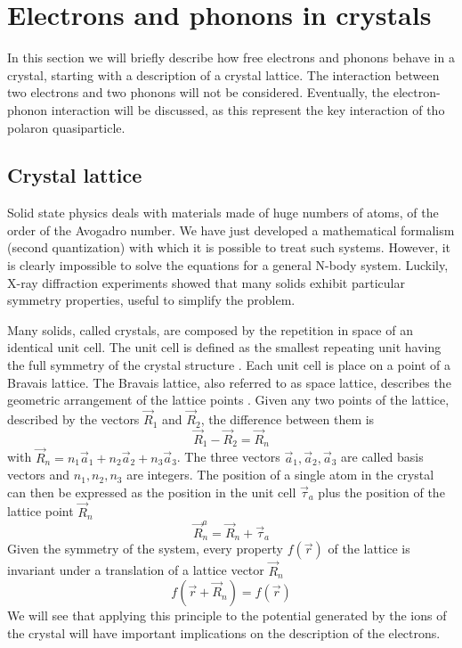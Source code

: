 \section{Electrons and phonons in crystals} \label{sec:electrons_phonons}
In this section we will briefly describe how free electrons and phonons behave in a crystal, starting with a description of a crystal lattice. The interaction between two electrons and two phonons will not be considered. Eventually, the electron-phonon interaction will be discussed, as this represent the key interaction of tho polaron quasiparticle.
\subsection{Crystal lattice} \label{sec:crystals}
Solid state physics deals with materials made of huge numbers of atoms, of the order of the Avogadro number. We have just developed a mathematical formalism (second quantization) with which it is possible to treat such systems. However, it is clearly impossible to solve the equations for a general N-body system. Luckily, X-ray diffraction experiments showed that many solids exhibit particular symmetry properties, useful to simplify the problem.

Many solids, called crystals, are composed by the repetition in space of an identical unit cell. The unit cell is defined as the smallest repeating unit having the full symmetry of the crystal structure \cite{westBasicSolidState1999}.
Each unit cell is place on a point of a Bravais lattice. The Bravais lattice, also referred to as space lattice, describes the geometric arrangement of the lattice points \cite{lernerEncyclopediaPhysicsVolumes2005}. Given any two points of the lattice, described by the vectors $\vec{R}_1$ and $\vec{R}_2$, the difference between them is
\begin{equation}
    \vec{R}_1 - \vec{R}_2 = \vec{R}_n
\end{equation}
with $\vec{R}_n = n_1\vec{a}_1 + n_2\vec{a}_2 + n_3\vec{a}_3$. The three vectors $\vec{a}_1, \vec{a}_2, \vec{a}_3$ are called basis vectors and $n_1, n_2, n_3$ are integers. The position of a single atom in the crystal can then be expressed as the position in the unit cell $\vec{\tau}_a$ plus the position of the lattice point $\vec{R}_n$
\begin{equation}
    \vec{R}_n^a = \vec{R}_n + \vec{\tau}_a
\end{equation}
Given the symmetry of the system, every property $f(\vec{r})$ of the lattice is invariant under a translation of a lattice vector $\vec{R}_n$
\begin{equation} \label{eq:translational_invariance}
    f(\vec{r}+\vec{R}_n) = f(\vec{r})
\end{equation}
We will see that applying this principle to the potential generated by the ions of the crystal will have important implications on the description of the electrons.

